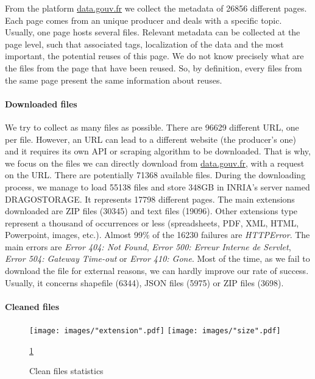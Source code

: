 \documentclass[a4paper]{article}
\begin{document}
	From the platform \href{http://www.data.gouv.fr/fr/}{data.gouv.fr} we collect the metadata of 26856 different pages. Each page comes from an unique producer and deals with a specific topic. Usually, one page hosts several files. Relevant metadata can be collected at the page level, such that associated tags, localization of the data and the most important, the potential reuses of this page. We do not know precisely what are the files from the page that have been reused. So, by definition, every files from the same page present the same information about reuses.
	
	\paragraph{Downloaded files}
	
	We try to collect as many files as possible. There are 96629 different URL, one per file. However, an URL can lead to a different website (the producer's one) and it requires its own API or scraping algorithm to be downloaded. That is why, we focus on the files we can directly download from \href{http://www.data.gouv.fr/fr/}{data.gouv.fr}, with a request on the URL. There are potentially 71368 available files. During the downloading process, we manage to load 55138 files and store 348GB in INRIA's server named DRAGOSTORAGE. It represents 17798 different pages. The main extensions downloaded are ZIP files (30345) and text files (19096). Other extensions type represent a thousand of occurrences or less (spreadsheets, PDF, XML, HTML, Powerpoint, images, etc.). Almost 99\% of the 16230 failures are \emph{HTTPError}. The main errors are \emph{Error 404: Not Found}, \emph{Error 500: Erreur Interne de Servlet}, \emph{Error 504: Gateway Time-out} or \emph{Error 410: Gone}. Most of the time, as we fail to download the file for external reasons, we can hardly improve our rate of success. Usually, it concerns shapefile (6344), JSON files (5975) or ZIP files (3698).
	
	\paragraph{Cleaned files}
	
	\begin{figure}[]
		\texttt{[image: images/"extension".pdf]}
		\label{fig:Original extension}
		\endminipage\hfill
		\texttt{[image: images/"size".pdf]}
		\label{fig:size}
		\endminipage
		\caption{Clean files statistics}
		\label{fig:clean}
		\ref{fig:clean}
	\end{figure}
	
\end{document}
